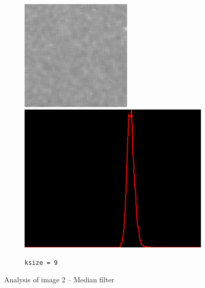 \begin{figure}[H]
\begin{subfigure}[b]{0.24\textwidth}
        \includegraphics[width=\textwidth]{img2/rect_9_median_9_final_img2.png}\\[0.1cm]
        \includegraphics[width=\textwidth]{img2/hist_rect_9_median_9_final_img2.png}
        \caption{\lstinline|ksize = 9|}
        \label{fig:img2_kernel9}
    \end{subfigure}
    \caption{Analysis of image 2 -- Median filter}\label{fig:img2}
\end{figure}

